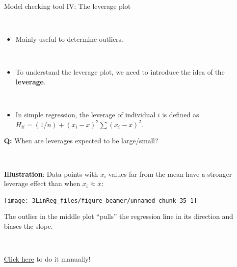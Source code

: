 \documentclass[10pt,ignorenonframetext,]{beamer}
\providecommand{\tightlist}{%
  \setlength{\itemsep}{0pt}\setlength{\parskip}{0pt}}
\begin{document}
\begin{frame}

\begin{block}{Model checking tool IV: The leverage plot}

\(~\)

\begin{itemize}
\tightlist
\item
  Mainly useful to determine outliers.
\end{itemize}

\(~\)

\begin{itemize}
\tightlist
\item
  To understand the leverage plot, we need to introduce the idea of the
  \textbf{leverage}.
\end{itemize}

\(~\)

\begin{itemize}
\tightlist
\item
  In simple regression, the leverage of individual \(i\) is defined as
  \(H_{ii} = (1/n) + (x_i-\overline{x})^2 \sum(x_i-\overline{x})^2\).
\end{itemize}

\vspace{7mm}

\textbf{Q:} When are leverages expected to be large/small?

\(~\)

\end{block}

\end{frame}

\begin{frame}

\textbf{Illustration}: Data points with \(x_i\) values far from the mean
have a stronger leverage effect than when \(x_i\approx \overline{x}\):

\begin{center}\texttt{[image: 3LinReg\_files/figure-beamer/unnamed-chunk-35-1]} \end{center}

The outlier in the middle plot ``pulls'' the regression line in its
direction and biases the slope.

\(~\)

\href{http://students.brown.edu/seeing-theory/regression-analysis/index.html}{Click here}
to do it manually!

\end{frame}
\end{document}
